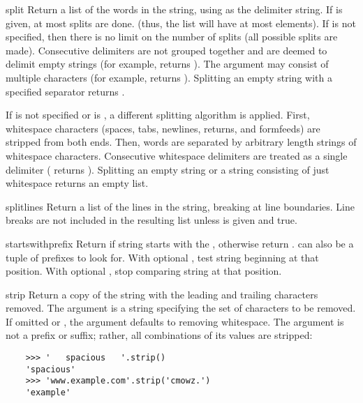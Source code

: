 \begin{methoddesc}[string]{split}{}
Return a list of the words in the string, using  as the
delimiter string.  If  is given, at most 
splits are done. (thus, the list will have at most 
elements).  If  is not specified, then there
is no limit on the number of splits (all possible splits are made).
Consecutive delimiters are not grouped together and are
deemed to delimit empty strings (for example, 
returns \samp{['1', '', '2']}).  The  argument may consist of
multiple characters (for example,  returns
\samp{['1', '2', '3']}).  Splitting an empty string with a specified
separator returns \samp{['']}.

If  is not specified or is , a different splitting
algorithm is applied.  First, whitespace characters (spaces, tabs,
newlines, returns, and formfeeds) are stripped from both ends.  Then,
words are separated by arbitrary length strings of whitespace
characters. Consecutive whitespace delimiters are treated as a single
delimiter ( returns \samp{['1', '2', '3']}).
Splitting an empty string or a string consisting of just whitespace
returns an empty list.
\end{methoddesc}

\begin{methoddesc}[string]{splitlines}{}
Return a list of the lines in the string, breaking at line
boundaries.  Line breaks are not included in the resulting list unless
 is given and true.
\end{methoddesc}

\begin{methoddesc}[string]{startswith}{prefix}
Return  if string starts with the , otherwise
return .   can also be a tuple of
prefixes to look for.  With optional , test string beginning at
that position.  With optional , stop comparing string at that
position.

\end{methoddesc}

\begin{methoddesc}[string]{strip}{}
Return a copy of the string with the leading and trailing characters
removed.  The  argument is a string specifying the set of
characters to be removed.  If omitted or , the 
argument defaults to removing whitespace.  The  argument is not
a prefix or suffix; rather, all combinations of its values are stripped:
\begin{verbatim}
    >>> '   spacious   '.strip()
    'spacious'
    >>> 'www.example.com'.strip('cmowz.')
    'example'
\end{verbatim}
\end{methoddesc}

